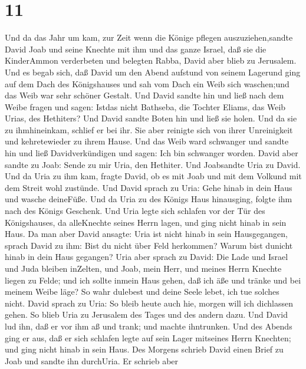 \hypertarget{section-10}{%
\section{11}\label{section-10}}

 Und da das Jahr um kam, zur Zeit wenn die Könige pflegen
auszuziehen,sandte David Joab und seine Knechte mit ihm und das ganze
Israel, daß sie die KinderAmmon verderbeten und belegten Rabba, David
aber blieb zu Jerusalem.  Und es begab sich, daß David um
den Abend aufstund von seinem Lagerund ging auf dem Dach des
Königshauses und sah vom Dach ein Weib sich waschen;und das Weib war
sehr schöner Gestalt.  Und David sandte hin und ließ nach
dem Weibe fragen und sagen: Istdas nicht Bathseba, die Tochter Eliams,
das Weib Urias, des Hethiters?  Und David sandte Boten hin
und ließ sie holen. Und da sie zu ihmhineinkam, schlief er bei ihr. Sie
aber reinigte sich von ihrer Unreinigkeit und kehretewieder zu ihrem
Hause.  Und das Weib ward schwanger und sandte hin und ließ
Davidverkündigen und sagen: Ich bin schwanger worden.  David
aber sandte zu Joab: Sende zu mir Uria, den Hethiter. Und Joabsandte
Uria zu David.  Und da Uria zu ihm kam, fragte David, ob es
mit Joab und mit dem Volkund mit dem Streit wohl zustünde. 
Und David sprach zu Uria: Gehe hinab in dein Haus und wasche deineFüße.
Und da Uria zu des Königs Haus hinausging, folgte ihm nach des Königs
Geschenk.  Und Uria legte sich schlafen vor der Tür des
Königshauses, da alleKnechte seines Herrn lagen, und ging nicht hinab in
sein Haus.  Da man aber David ansagte: Uria ist nicht hinab
in sein Hausgegangen, sprach David zu ihm: Bist du nicht über Feld
herkommen? Warum bist dunicht hinab in dein Haus gegangen? 
Uria aber sprach zu David: Die Lade und Israel und Juda bleiben
inZelten, und Joab, mein Herr, und meines Herrn Knechte liegen zu Felde;
und ich sollte inmein Haus gehen, daß ich äße und tränke und bei meinem
Weibe läge? So wahr dulebest und deine Seele lebet, ich tue solches
nicht.  David sprach zu Uria: So bleib heute auch hie,
morgen will ich dichlassen gehen. So blieb Uria zu Jerusalem des Tages
und des andern dazu.  Und David lud ihn, daß er vor ihm aß
und trank; und machte ihntrunken. Und des Abends ging er aus, daß er
sich schlafen legte auf sein Lager mitseines Herrn Knechten; und ging
nicht hinab in sein Haus.  Des Morgens schrieb David einen
Brief zu Joab und sandte ihn durchUria.  Er schrieb aber

